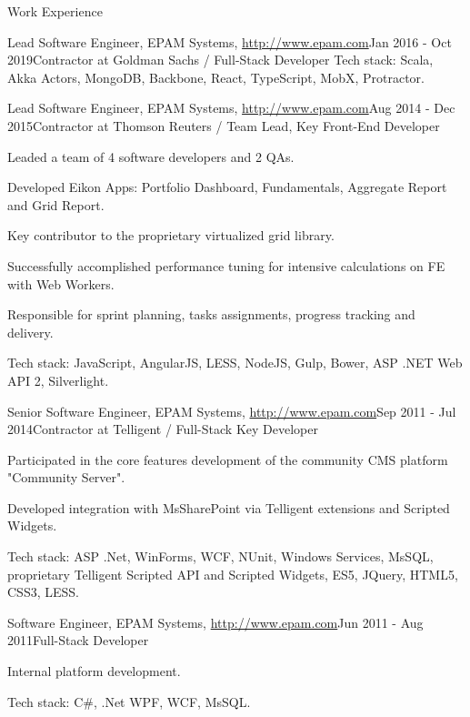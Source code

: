 \documentclass{resume}
\begin{document}
\begin{rSection}{Work Experience}
\begin{rSubsection}{Lead Software Engineer, EPAM Systems, \url{http://www.epam.com}}{Jan 2016 - Oct 2019}{Contractor at Goldman Sachs / Full-Stack Developer}{}
Tech stack: Scala, Akka Actors, MongoDB, Backbone, React, TypeScript, MobX, Protractor.
\end{rSubsection}


\begin{rSubsection}{Lead Software Engineer, EPAM Systems, \url{http://www.epam.com}}{Aug 2014 - Dec 2015}{Contractor at Thomson Reuters / Team Lead, Key Front-End Developer}{}
\item Leaded a team of 4 software developers and 2 QAs.
\item Developed Eikon Apps: Portfolio Dashboard, Fundamentals, Aggregate Report and Grid Report.
\item Key contributor to the proprietary virtualized grid library.
\item Successfully accomplished performance tuning for intensive calculations on FE with Web Workers.
\item Responsible for sprint planning, tasks assignments, progress tracking and delivery.

Tech stack: JavaScript, AngularJS, LESS, NodeJS, Gulp, Bower, ASP .NET Web API 2, Silverlight.
\end{rSubsection}

\begin{rSubsection}{Senior Software Engineer, EPAM Systems, \url{http://www.epam.com}}{Sep 2011 - Jul 2014}{Contractor at Telligent / Full-Stack Key Developer}{}
\item Participated in the core features development of the community CMS platform "Community Server".
\item Developed integration with MsSharePoint via Telligent extensions and Scripted Widgets.

Tech stack:  ASP .Net, WinForms, WCF, NUnit, Windows Services, MsSQL, proprietary Telligent Scripted API and Scripted Widgets, ES5, JQuery, HTML5, CSS3, LESS.
\end{rSubsection}


\begin{rSubsection}{Software Engineer, EPAM Systems, \url{http://www.epam.com}}{Jun 2011 - Aug 2011}{Full-Stack Developer}{}
\item Internal platform development.

Tech stack: C\#, .Net WPF, WCF, MsSQL.
\end{rSubsection}

\end{rSection}

\end{document}
